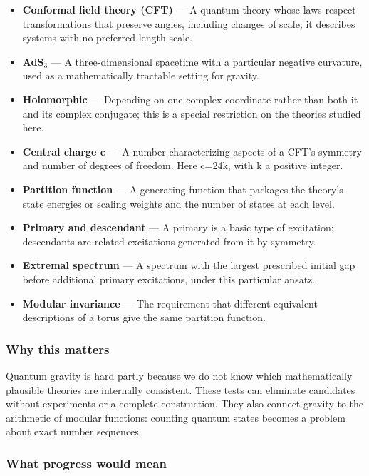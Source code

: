 \documentclass[
  11pt,
]{article}
\begin{document}
\begin{itemize}
\item
  \textbf{Conformal field theory (CFT)} --- A quantum theory whose laws
  respect transformations that preserve angles, including changes of
  scale; it describes systems with no preferred length scale.
\item
  \textbf{AdS\ensuremath{{}_{3}}} --- A three-dimensional spacetime with
  a particular negative curvature, used as a mathematically tractable
  setting for gravity.
\item
  \textbf{Holomorphic} --- Depending on one complex coordinate rather
  than both it and its complex conjugate; this is a special restriction
  on the theories studied here.
\item
  \textbf{Central charge c} --- A number characterizing aspects of a
  CFT's symmetry and number of degrees of freedom. Here c=24k, with k a
  positive integer.
\item
  \textbf{Partition function} --- A generating function that packages
  the theory's state energies or scaling weights and the number of
  states at each level.
\item
  \textbf{Primary and descendant} --- A primary is a basic type of
  excitation; descendants are related excitations generated from it by
  symmetry.
\item
  \textbf{Extremal spectrum} --- A spectrum with the largest prescribed
  initial gap before additional primary excitations, under this
  particular ansatz.
\item
  \textbf{Modular invariance} --- The requirement that different
  equivalent descriptions of a torus give the same partition function.
\end{itemize}

\subsubsection{Why this matters}

Quantum gravity is hard partly because we do not know which
mathematically plausible theories are internally consistent. These tests
can eliminate candidates without experiments or a complete construction.
They also connect gravity to the arithmetic of modular functions:
counting quantum states becomes a problem about exact number sequences.

\subsubsection{What progress would mean}
\end{document}
